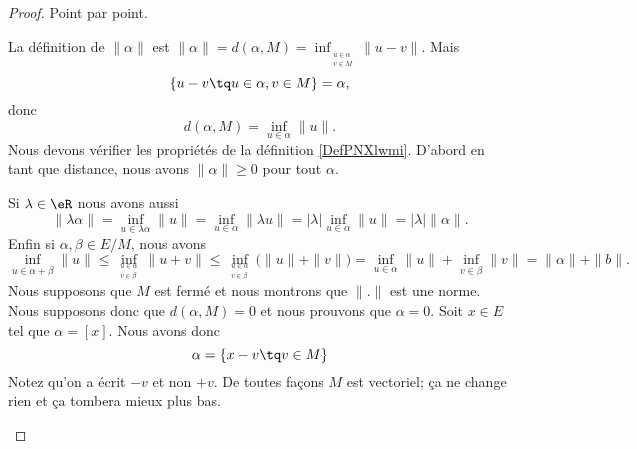 \begin{proof}
    Point par point.
    \begin{subproof}
        La définition de \( \| \alpha \|\) est \( \| \alpha \|=d(\alpha,M)=\inf_{_{\substack{u\in \alpha\\v\in M}}}\| u-v \|\). Mais 
        \begin{equation}
            \{ u-v\tq u\in \alpha,v\in M \}=\alpha,
        \end{equation}
        donc
        \begin{equation}
            d(\alpha,M)=\inf_{u\in \alpha}\| u \|.
        \end{equation}
        Nous devons vérifier les propriétés de la définition \ref{DefPNXlwmi}. D'abord en tant que distance, nous avons \( \| \alpha \|\geq 0\) pour tout \( \alpha\).

        Si \( \lambda\in \eR\) nous avons aussi
        \begin{equation}
            \| \lambda\alpha \|=\inf_{u\in \lambda \alpha}\| u \|=\inf_{u\in \alpha}\| \lambda u \|=| \lambda |\inf_{u\in \alpha}\| u \|=| \lambda |\| \alpha \|.
        \end{equation}
        Enfin si \( \alpha,\beta\in E/M\), nous avons
        \begin{equation}
            \inf_{u\in \alpha+\beta}\| u \|\leq \inf_{_{\substack{u\in \alpha\\v\in \beta}}}\| u+v \|\leq \inf_{_{\substack{u\in \alpha\\v\in \beta}}}\big( \| u \|+\| v \| \big)=\inf_{u\in \alpha}\| u \|+\inf_{v\in \beta}\| v \|=\| \alpha \|+\| b \|.
        \end{equation}
        Nous supposons que \( M\) est fermé et nous montrons que \( \| . \|\) est une norme. Nous supposons donc que \( d(\alpha,M)=0\) et nous prouvons que \( \alpha=0\). Soit \( x\in E\) tel que \( \alpha=[x]\). Nous avons donc
        \begin{equation}
            \alpha=\{ x-v\tq v\in M \}
        \end{equation}
        Notez qu'on a écrit \( -v\) et non \( +v\). De toutes façons \( M\) est vectoriel; ça ne change rien et ça tombera mieux plus bas.


\end{subproof}
\end{proof}
